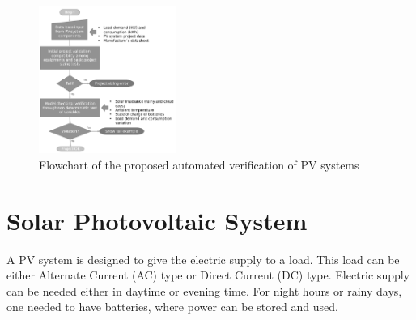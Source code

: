 \documentclass[journal]{IEEEtran}
\begin{document}

\begin{figure}[h]
\includegraphics[width=0.4\textwidth]{flowchart_verification.png}
\centering
\caption{Flowchart of the proposed automated verification of PV systems}
\label{fig:flowchartgeneral}
\end{figure}

 

\section{Solar Photovoltaic System }
A PV system is designed to give the electric supply to a load. This load can be either Alternate Current (AC) type or Direct Current (DC) type. Electric supply can be needed either in daytime or evening time. 
For night hours or rainy days, one needed to have batteries, where power can be stored and used.%
\end{document}
